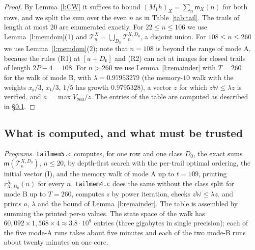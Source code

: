 \begin{proof}
By Lemma~\ref{l:CW} it suffices to bound $(M_1 h)_X = \sum_n \mathsf m_X(n)$ for both rows, and we split the sum over the even $n$ as in Table~\ref{tab:tail}. The trails of length at most $20$ are enumerated exactly. For $22 \le n \le 106$ we use Lemma~\ref{l:memdom}(1) and $\mathcal T^X_n = \bigcup_{D_0} \mathcal T^{X, D_0}_n$, a disjoint union. For $108 \le n \le 260$ we use Lemma~\ref{l:memdom}(2); note that $n = 108$ is beyond the range of mode A, because the rules (R1) at $[u + D_0]$ and (R2) can act at images for closed trails of length $2P - 4 = 108$. For $n > 260$ we use Lemma~\ref{l:remainder} with $T = 260$ for the walk of mode B, with $\lambda = 0.97953279$ (the memory-$10$ walk with the weights $x_{\mathrm s}/3$, $x_{\mathrm t}/3$, $1/5$ has growth $0.9795328$), a vector $z$ for which $z \mathbb W \le \lambda z$ is verified, and $a = \max V_{260}/z$. The entries of the table are computed as described in \S\ref{s:tailtrust}.
\end{proof}

\subsection{What is computed, and what must be trusted}\label{s:tailtrust}

\emph{Programs.} \texttt{tailmem5.c} computes, for one row and one class $D_0$, the exact sums $\mathsf m(\mathcal T^{X, D_0}_n)$, $n \le 20$, by depth-first search with the per-trail optimal ordering, the initial vector (I), and the memory walk of mode A up to $t = 109$, printing $r^{\mathrm A}_{X, D_0}(n)$ for every $n$. \texttt{tailmem4.c} does the same without the class split for mode B up to $T = 260$, computes $z$ by power iteration, checks $z \mathbb W \le \lambda z$, and prints $a$, $\lambda$ and the bound of Lemma~\ref{l:remainder}. The table is assembled by summing the printed per-$n$ values. The state space of the walk has $60{,}092 \times 1{,}568 \times 4 \approx 3.8 \cdot 10^8$ entries (three gigabytes in single precision); each of the five mode-A runs takes about five minutes and each of the two mode-B runs about twenty minutes on one core.


